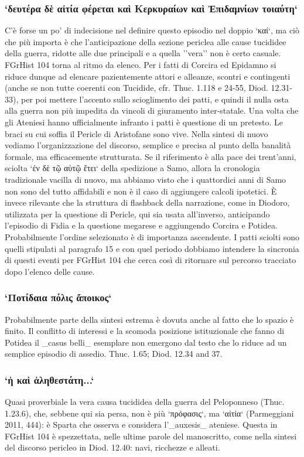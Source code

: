 {            \subsubsection{`δευτέρα δὲ αἰτία φέρεται καὶ Κερκυραίων καὶ Ἐπιδαμνίων τοιαύτη`}
            C'è forse un po' di indecisione nel definire questo episodio nel doppio `καί`, ma ciò che più importa è che l'anticipazione della sezione periclea alle cause tucididee della guerra, ridotte alle due principali e a quella ''vera'' non è certo casuale. FGrHist 104 torna al ritmo da elenco. Per i fatti di Corcira ed Epidamno si riduce dunque ad elencare pazientemente attori e alleanze, scontri e contingenti  (anche se non tutte coerenti con Tucidide, cfr. Thuc. 1.118 e 24-55, Diod. 12.31-33), per poi mettere l'accento sullo scioglimento dei patti, e quindi il nulla osta alla guerra non più impedita da vincoli di giuramento inter-statale. Una volta che gli Ateniesi hanno ufficialmente infranto i patti è questione di un pretesto. Le braci su cui soffia il Pericle di Aristofane sono vive. Nella sintesi di nuovo vediamo l'organizzazione del discorso, semplice e precisa al punto della banalità formale, ma efficacemente strutturata. Se il riferimento è alla pace dei trent'anni, sciolta `ἐν δὲ τῷ αὐτῷ ἔτει` della spedizione a Samo, allora la cronologia tradizionale vacilla di nuovo, ma abbiamo visto che i quattordici anni di Samo non sono del tutto affidabili e non è il caso di aggiungere calcoli ipotetici. È invece rilevante che la struttura di flashback della narrazione, come in Diodoro, utilizzata per la questione di Pericle, qui sia usata all'inverso, anticipando l'episodio di Fidia e la questione megarese e aggiungendo Corcira e Potidea. Probabilmente l'ordine selezionato è di importanza ascendente. I patti sciolti sono quelli stipulati al paragrafo 15 e con quel periodo dobbiamo intendere la sincronia di questi eventi per FGrHist 104 che cerca così di ritornare sul percorso tracciato dopo l'elenco delle cause.
            
            \subsubsection{`Ποτίδαια πόλις ἄποικος`}
           Probabilmente parte della sintesi estrema è dovuta anche al fatto che lo spazio è finito. Il conflitto di interessi e la scomoda posizione istituzionale che fanno di Potidea il _casus belli_ esemplare non emergono dal testo che lo riduce ad un semplice episodio di assedio. Thuc. 1.65; Diod. 12.34 and 37.
            
            \subsubsection{`ἡ καὶ ἀληθεστάτη...`}
            Quasi proverbiale la vera causa tucididea della guerra del Peloponneso (Thuc. 1.23.6), che, sebbene qui sia persa, non è più `πρόφασις`, ma `αἰτία` (Parmeggiani 2011, 444): è Sparta che osserva e considera l'_auxesis_  ateniese. Questa in FGrHist 104 è spezzettata, nelle ultime parole del manoscritto, come nella sintesi del discorso pericleo in Diod. 12.40: navi, ricchezze e alleati. 
            }
